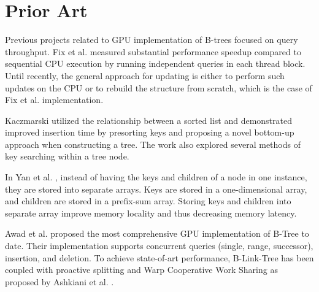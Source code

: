\section{Prior Art}



Previous projects related to GPU implementation of B-trees focused on query throughput. Fix et al. \cite{fix2011accelerating} measured substantial performance speedup compared to sequential CPU execution by running independent queries in each thread block. Until recently, the general approach for updating is either to perform such updates on the CPU or to rebuild the structure from scratch, which is the case of Fix et al. implementation.

Kaczmarski \cite{kaczmarski} utilized the relationship between a sorted list and demonstrated improved insertion time by presorting keys and proposing a novel bottom-up approach when constructing a tree. The work also explored several methods of key searching within a tree node.

In Yan et al. \cite{harmonia}, instead of having the keys and children of a node in one instance, they are stored into separate arrays. Keys are stored in a one-dimensional array, and children are stored in a prefix-sum array. Storing keys and children into separate array improve memory locality and thus decreasing memory latency.

Awad et al. \cite{awad} proposed the most comprehensive GPU implementation of B-Tree to date. Their implementation supports concurrent queries (single, range, successor), insertion, and deletion. To achieve state-of-art performance, B-Link-Tree has been coupled with proactive splitting and Warp Cooperative Work Sharing as proposed by Ashkiani et al. \cite{ashkiani2018dynamic}.

